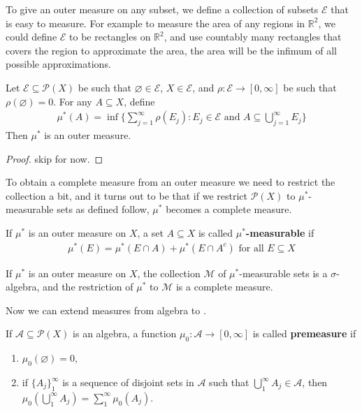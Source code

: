 To give an outer measure on any subset, we define a collection of subsets $\mathcal{E}$ that is easy to measure. For example to measure the area of any regions in $\mathbb{R}^{2}$, we could define $\mathcal{E}$ to be rectangles on $\mathbb{R}^{2}$, and use countably many rectangles that covers the region to approximate the area, the area will be the infimum of all possible approximations.
\begin{proposition}
    \normalfont Let $\mathcal{E} \subseteq \mathcal{P}(X)$ be such that $\varnothing \in \mathcal{E}$, $X \in \mathcal{E}$, and $\rho : \mathcal{E} \to [0,\infty]$ be such that $\rho(\varnothing)=0$. For any $A \subseteq X$, define
    \begin{align*}
        \mu^{*}(A) = \inf\{ \sum\limits_{j=1}^{\infty} \rho(E_j) : E_j \in \mathcal{E} \text{ and } A \subseteq \bigcup_{j = 1}^{\infty} E_j \}
    \end{align*}
    Then $\mu^{*}$ is an outer measure.
\end{proposition}
\begin{proof}
skip for now.
\end{proof}

To obtain a complete measure from an outer measure we need to restrict the collection a bit, and it turns out to be that if we restrict $\mathcal{P}(X)$ to $\mu^{*}$-measurable sets as defined follow, $\mu^{*}$ becomes a complete measure.
\begin{definition}[$\mu^{*}$-measurable]
 \normalfont If $\mu^{*}$ is an outer measure on $X$, a set $A \subseteq X$ is called \textbf{$\mu^{*}$-measurable} if
 \begin{align*}
    \mu^{*}(E) = \mu^{*}(E \cap A) + \mu^{*}(E \cap A^{c}) \text{ for all } E \subseteq X
 \end{align*}
\end{definition}

\begin{theorem}
 \normalfont If $\mu^{*}$ is an outer measure on $X$, the collection $\mathcal{M}$ of $\mu^{*}$-measurable sets is a $\sigma$-algebra, and the restriction of $\mu^{*}$ to $\mathcal{M}$ is a complete measure.
\end{theorem}

Now we can extend measures from algebra to \sal.

\begin{definition}[Premeasure]
 \normalfont If $\mathcal{A} \subseteq \mathcal{P}(X)$ is an algebra, a function $\mu_0 : \mathcal{A} \to [0,\infty]$ is called \textbf{premeasure} if
 \begin{enumerate}
    \item $\mu_0(\varnothing)=0$,
    \item if $\{ A_j \}_{1}^{\infty}$ is a sequence of disjoint sets in $\mathcal{A}$ such that $\bigcup_{1}^{\infty}A_j \in \mathcal{A}$, then $\mu_0(\bigcup_{1}^{\infty}A_j) = \sum_{1}^{\infty}\mu_0(A_j)$.
 \end{enumerate}
\end{definition}




